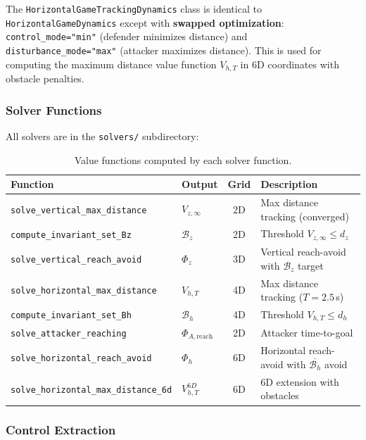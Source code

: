\documentclass[11pt,a4paper]{article}
\begin{document}
The \texttt{HorizontalGameTrackingDynamics} class is identical to \texttt{HorizontalGameDynamics} except with \textbf{swapped optimization}: \texttt{control\_mode="min"} (defender minimizes distance) and \texttt{disturbance\_mode="max"} (attacker maximizes distance). This is used for computing the maximum distance value function $V_{h,T}$ in 6D coordinates with obstacle penalties.

\subsubsection{Solver Functions}

All solvers are in the \texttt{solvers/} subdirectory:

\begin{table}[h]
\centering
\caption{Value functions computed by each solver function.}
\begin{tabular}{llcp{5.5cm}}
\toprule
\textbf{Function} & \textbf{Output} & \textbf{Grid} & \textbf{Description} \\
\midrule
\texttt{solve\_vertical\_max\_distance} & $V_{z,\infty}$ & 2D & Max distance tracking (converged) \\
\texttt{compute\_invariant\_set\_Bz} & $\mathcal{B}_z$ & 2D & Threshold $V_{z,\infty} \leq d_z$ \\
\texttt{solve\_vertical\_reach\_avoid} & $\Phi_z$ & 3D & Vertical reach-avoid with $\mathcal{B}_z$ target \\
\texttt{solve\_horizontal\_max\_distance} & $V_{h,T}$ & 4D & Max distance tracking ($T=2.5$\,s) \\
\texttt{compute\_invariant\_set\_Bh} & $\mathcal{B}_h$ & 4D & Threshold $V_{h,T} \leq d_h$ \\
\texttt{solve\_attacker\_reaching} & $\Phi_{A,\text{reach}}$ & 2D & Attacker time-to-goal \\
\texttt{solve\_horizontal\_reach\_avoid} & $\Phi_h$ & 6D & Horizontal reach-avoid with $\overline{\mathcal{B}_h}$ avoid \\
\texttt{solve\_horizontal\_max\_distance\_6d} & $V_{h,T}^{6D}$ & 6D & 6D extension with obstacles \\
\bottomrule
\end{tabular}
\end{table}

\subsubsection{Control Extraction}
\end{document}
